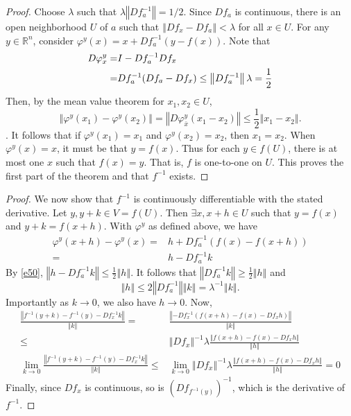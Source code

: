 \documentclass[compress]{beamer}
\def\R{\mathbb{R}}
\newcommand{\norm}[1]{\left\Vert {#1} \right\Vert}
\renewcommand{\to}{{\rightarrow}}
\begin{document}
\begin{frame}
  \begin{proof}
    Choose $\lambda$ such that $\lambda \norm{Df_a^{-1}} = 1/2$. Since
    $Df_a$ is continuous, there is an open neighborhood $U$ of $a$ such
    that $\norm{Df_x - Df_a} < \lambda$ for all $x \in U$. For any $y
    \in \R^n$, consider $\varphi^y(x) = x + Df_a^{-1} \left(y - f(x)
    \right)$. Note that 
    \begin{align}
      D \varphi^y_x = & I - Df_a^{-1} Df_x \notag \\ 
      = & Df_a^{-1} (Df_a - Df_x) \leq \norm{Df_a^{-1}} \lambda =
      \frac{1}{2} \label{e50}
    \end{align}
    Then, by the mean value theorem for $x_1, x_2 \in U$, 
    \[ \norm{\varphi^y(x_1) - \varphi^y(x_2)} = \norm{D\varphi^y_{\bar{x}}
      (x_1 - x_2) } \leq \frac{1}{2} \norm{x_1 - x_2}. \].
    It follows that if $\varphi^y(x_1) = x_1$ and $\varphi^y(x_2) =
    x_2$, then $x_1 = x_2$.
    When $\varphi^y(x) = x$, it must be that $y = f(x)$. Thus for each
    $y \in f(U)$, there is at most one $x$ such that $f(x) = y$. That
    is, $f$ is one-to-one on $U$. This proves the first part of the
    theorem and that $f^{-1}$ exists. 
  \end{proof}
\end{frame}

\begin{frame}\begin{proof}
    We now show that $f^{-1}$ is continuously differentiable with the
    stated derivative. Let $y, y+k \in V = f(U)$. Then $\exists x, x+h
    \in U$ such that $y = f(x)$ and $y+k = f(x+h)$. With $\varphi^y$ as
    defined above, we have
  \begin{align*}
    \varphi^y(x+h) - \varphi^y(x) = & h + Df_a^{-1}(f(x) - f(x+h))  \\
    = & h - Df_a^{-1} k
  \end{align*}
  By \ref{e50}, $\norm{h - Df_a^{-1} k} \leq \frac{1}{2} \norm{h}$. It
  follows that $\norm{Df_a^{-1} k} \geq \frac{1}{2} \norm{h}$ and 
  \[ \norm{h} \leq 2 \norm{Df_a^{-1}} \norm{k} = \lambda^{-1}
  \norm{k}. \]
  Importantly as $k \to 0$, we also have $h \to 0$. Now, 
  \begin{align*}
    \frac{\norm{f^{-1} (y+k) - f^{-1}(y) - Df_x^{-1} k }}{\norm{k}}
    = & \frac{\norm{-Df_x^{-1}(f(x+h) - f(x) - Df_x h)}}{\norm{k}}
    \\
    \leq & \norm{Df_x}^{-1}\lambda \frac{\norm{f(x+h) - f(x) - Df_x
        h}}{\norm{h}} \\
    \lim_{k \to 0} \frac{\norm{f^{-1} (y+k) - f^{-1}(y) - Df_x^{-1} k
      }}{\norm{k}} \leq & \lim_{k \to 0} \norm{Df_x}^{-1}\lambda
    \frac{\norm{f(x+h) - f(x) - Df_x h}}{\norm{h}} = 0
  \end{align*}
  Finally, since $Df_x$ is continuous, so is $(Df_{f^{-1}(y)})^{-1}$,
  which is the derivative of $f^{-1}$.  
\end{proof}
\end{frame}
\end{document}
